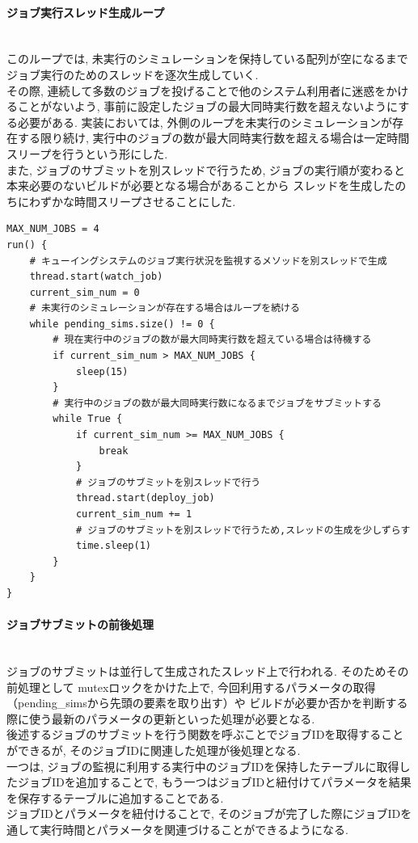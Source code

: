 \paragraph{ジョブ実行スレッド生成ループ}~\\
このループでは, 未実行のシミュレーションを保持している配列が空になるまで
ジョブ実行のためのスレッドを逐次生成していく.\\
その際, 連続して多数のジョブを投げることで他のシステム利用者に迷惑をかけることがないよう,
事前に設定したジョブの最大同時実行数を超えないようにする必要がある.
実装においては, 外側のループを未実行のシミュレーションが存在する限り続け,
実行中のジョブの数が最大同時実行数を超える場合は一定時間スリープを行うという形にした.\\
また, ジョブのサブミットを別スレッドで行うため, ジョブの実行順が変わると本来必要のないビルドが必要となる場合があることから
スレッドを生成したのちにわずかな時間スリープさせることにした.\\

{\footnotesize
\begin{lstlisting}[caption=ジョブ実行スレッドを生成するループ　疑似コード,frame=single]
MAX_NUM_JOBS = 4
run() {
    # キューイングシステムのジョブ実行状況を監視するメソッドを別スレッドで生成
    thread.start(watch_job)
    current_sim_num = 0
    # 未実行のシミュレーションが存在する場合はループを続ける
    while pending_sims.size() != 0 {
        # 現在実行中のジョブの数が最大同時実行数を超えている場合は待機する
        if current_sim_num > MAX_NUM_JOBS {
            sleep(15)
        }
        # 実行中のジョブの数が最大同時実行数になるまでジョブをサブミットする
        while True {
            if current_sim_num >= MAX_NUM_JOBS {
                break
            }
            # ジョブのサブミットを別スレッドで行う
            thread.start(deploy_job)
            current_sim_num += 1
            # ジョブのサブミットを別スレッドで行うため,スレッドの生成を少しずらす
            time.sleep(1)
        }
    }
}
\end{lstlisting}
}

\paragraph{ジョブサブミットの前後処理}~\\
ジョブのサブミットは並行して生成されたスレッド上で行われる. そのためその前処理として
mutexロックをかけた上で, 今回利用するパラメータの取得（pending\_simsから先頭の要素を取り出す）や
ビルドが必要か否かを判断する際に使う最新のパラメータの更新といった処理が必要となる.\\
後述するジョブのサブミットを行う関数を呼ぶことでジョブIDを取得することができるが, そのジョブIDに関連した処理が後処理となる.\\
一つは, ジョブの監視に利用する実行中のジョブIDを保持したテーブルに取得したジョブIDを追加することで,
もう一つはジョブIDと紐付けてパラメータを結果を保存するテーブルに追加することである.\\
ジョブIDとパラメータを紐付けることで, そのジョブが完了した際にジョブIDを通して実行時間とパラメータを関連づけることができるようになる.\\

